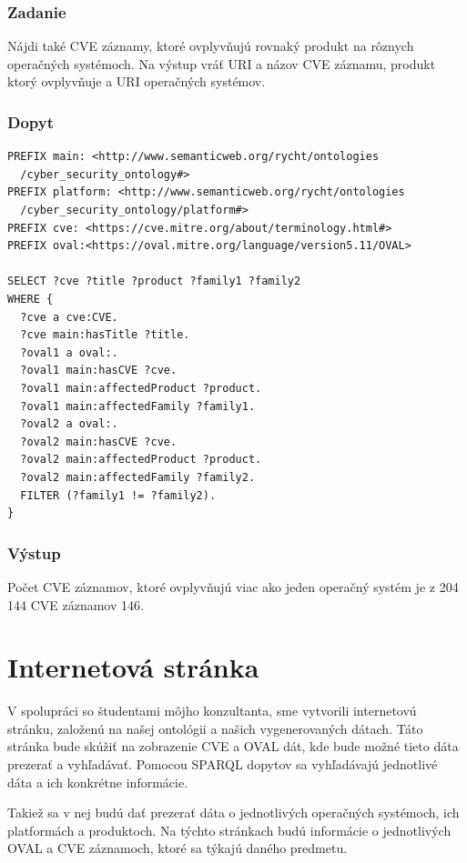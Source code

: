 \documentclass[12pt, a4paper, oneside]{book}
\begin{document}
\subsubsection*{Zadanie}
Nájdi také CVE záznamy, ktoré ovplyvňujú rovnaký produkt na rôznych operačných systémoch. Na výstup vráť URI a názov CVE záznamu, produkt ktorý ovplyvňuje a URI operačných systémov.


\subsubsection*{Dopyt}
\begin{small}
\begin{verbatim}
PREFIX main: <http://www.semanticweb.org/rycht/ontologies
  /cyber_security_ontology#>
PREFIX platform: <http://www.semanticweb.org/rycht/ontologies
  /cyber_security_ontology/platform#>
PREFIX cve: <https://cve.mitre.org/about/terminology.html#>
PREFIX oval:<https://oval.mitre.org/language/version5.11/OVAL>

SELECT ?cve ?title ?product ?family1 ?family2
WHERE {
  ?cve a cve:CVE.
  ?cve main:hasTitle ?title.
  ?oval1 a oval:.
  ?oval1 main:hasCVE ?cve.
  ?oval1 main:affectedProduct ?product.
  ?oval1 main:affectedFamily ?family1.
  ?oval2 a oval:.
  ?oval2 main:hasCVE ?cve.
  ?oval2 main:affectedProduct ?product.
  ?oval2 main:affectedFamily ?family2.
  FILTER (?family1 != ?family2).
} 
\end{verbatim}
\end{small}


\subsubsection*{Výstup}
Počet CVE záznamov, ktoré ovplyvňujú viac ako jeden operačný systém je z 204 144 CVE záznamov 146.



\section{Internetová stránka}
V spolupráci so študentami môjho konzultanta, sme vytvorili internetovú stránku, založenú na našej ontológii a našich vygenerovaných dátach. Táto stránka bude skúžiť na zobrazenie CVE a OVAL dát, kde bude možné tieto dáta prezerať a vyhľadávať. Pomocou SPARQL dopytov sa vyhľadávajú jednotlivé dáta a ich konkrétne informácie.


Takiež sa v nej budú dať prezerať dáta o jednotlivých operačných systémoch, ich platformách a produktoch. Na týchto stránkach budú informácie o jednotlivých OVAL a CVE záznamoch, ktoré sa týkajú daného predmetu.
\end{document}

